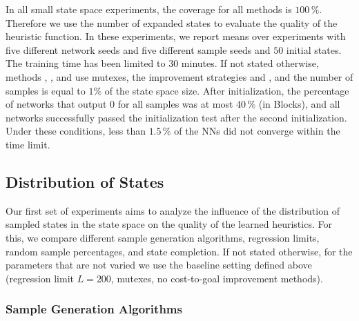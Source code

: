 

In all small state space experiments, the coverage for all methods is $100\,\%$. Therefore we use the number of expanded states to evaluate the quality of the heuristic function.  In these experiments, we report means over experiments with five different network seeds and five different sample seeds and $50$ initial states. The training time has been limited to $30$ minutes. If not stated otherwise, methods \bfs, \dfs, \rw and \bfsrw use mutexes, the improvement strategies \hmin and \hvfc, and the number of samples is equal to $1\%$ of the state space size. After initialization, the percentage of networks that output $0$ for all samples was at most $40\,\%$ (in Blocks), and all networks successfully passed the initialization test after the second initialization. Under these conditions, less than $1.5\,\%$ of the NNs did not converge within the time limit.

\subsection{Distribution of States}
\label{sec:experiment1-subset}

Our first set of experiments aims to analyze the influence of the distribution of sampled states in the state space on the quality of the learned heuristics. For this, we compare different sample generation algorithms, regression limits, random sample percentages, and state completion. If not stated otherwise, for the parameters that are not varied we use the baseline setting defined above (regression limit $L=200$,  mutexes, no cost-to-goal improvement methods).

\subsubsection{Sample Generation Algorithms}

